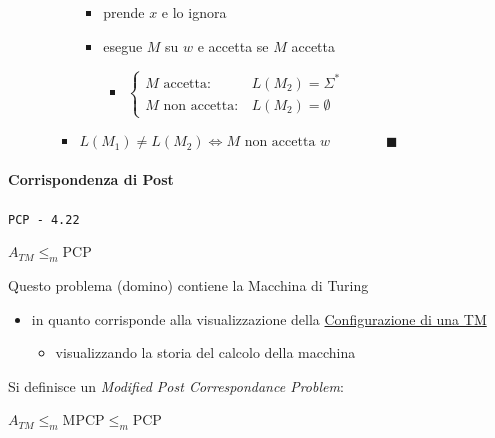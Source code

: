 \documentclass[
                        12pt, %
                        a4paper, %
                        oneside, %
                        headinclude,footinclude, %
                        BCOR5mm, %
                  ]{scrartcl}
\begin{document}
\begin{enumerate}
\begin{itemize}
\begin{itemize}
\begin{itemize}
\item prende \(x\) e lo ignora
\item esegue \(M\) su \(w\) e accetta se \(M\) accetta
\begin{itemize}
\item \(\begin{cases} M \mbox{ accetta}: & L(M_{2})=\Sigma^{*}\\M \mbox{ non accetta}: & L(M_{2}) = \emptyset  \end{cases}\)
\end{itemize}
\end{itemize}
\item \(L(M_{1}) \neq L(M_{2}) \iff M \mbox{ non accetta }w \qquad\qquad \blacksquare\)
\end{itemize}
\end{itemize}
\end{enumerate}

\paragraph{Corrispondenza di Post}
\label{sec:org3a852ff}
\texttt{PCP - 4.22}

\(A_{TM} \le_{m} \text{PCP}\)

Questo problema (domino) contiene la Macchina di Turing
\begin{itemize}
\item in quanto corrisponde alla visualizzazione della \hyperref[sec:org8b15e85]{Configurazione di una TM}
\begin{itemize}
\item visualizzando la storia del calcolo della macchina
\end{itemize}
\end{itemize}

Si definisce un \emph{Modified Post Correspondance Problem}:

\(A_{TM} \le_{m} \text{MPCP} \le_{m} \text{PCP}\)
\end{document}
